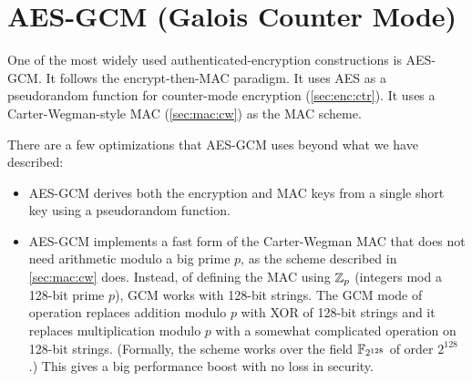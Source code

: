 \section{AES-GCM (Galois Counter Mode)}\label{sec:enc:gcm}
One of the most widely used authenticated-encryption constructions is AES-GCM.
It follows the encrypt-then-MAC paradigm.
It uses AES as a pseudorandom function for counter-mode encryption (\cref{sec:enc:ctr}).
It uses a Carter-Wegman-style MAC (\cref{sec:mac:cw}) as the MAC scheme.

There are a few optimizations that AES-GCM uses beyond what we have described:
\begin{itemize}
  \item AES-GCM derives both the encryption and MAC keys from a single short key
        using a pseudorandom function.
  \item AES-GCM implements a fast form of the Carter-Wegman MAC that does not 
        need arithmetic modulo a big prime $p$, as the scheme described in \cref{sec:mac:cw} does.
        Instead, of defining the MAC using $\mathbb{Z}_p$ (integers mod a 128-bit prime $p$),
        GCM works with 128-bit strings.
        The GCM mode of operation replaces addition modulo $p$ with XOR of 128-bit strings
        and it replaces multiplication modulo $p$ with a somewhat complicated operation
        on 128-bit strings. 
        (Formally, the scheme works over the field $\mathbb{F}_{2^{128}}$ of order $2^{128}$.)
        This gives a big performance boost with no loss in security.
\end{itemize}



